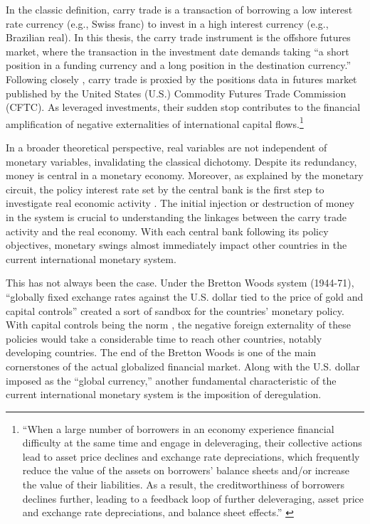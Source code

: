 \documentclass[a4paper, twoside]{templates/ociamthesis}
\begin{document}
In the classic definition, carry trade is a transaction of borrowing a low interest rate currency (e.g., Swiss franc) to invest in a high interest currency (e.g., Brazilian real). In this thesis, the carry trade instrument is the offshore futures market, where the transaction in the investment date demands taking ``a short position in a funding currency and a long position in the destination currency.'' \autocite[ 9]{bankforinternationalsettlements2015} Following closely \textcite{brunnermeier2008}, carry trade is proxied by the positions data in futures market published by the United States (U.S.) Commodity Futures Trade Commission (CFTC). As leveraged investments, their sudden stop contributes to the financial amplification of negative externalities of international capital flows.\footnote{``When a large number of borrowers in an economy experience financial difficulty at the same time and engage in deleveraging, their collective actions lead to asset price declines and exchange rate depreciations, which frequently reduce the value of the assets on borrowers' balance sheets and/or increase the value of their liabilities. As a result, the creditworthiness of borrowers declines further, leading to a feedback loop of further deleveraging, asset price and exchange rate depreciations, and balance sheet effects.'' \autocite[ 10]{erten2019}}

In a broader theoretical perspective, real variables are not independent of monetary variables, invalidating the classical dichotomy. Despite its redundancy, money is central in a monetary economy. Moreover, as explained by the monetary circuit, the policy interest rate set by the central bank is the first step to investigate real economic activity \autocite[  332]{rochon2015}. The initial injection or destruction of money in the system is crucial to understanding the linkages between the carry trade activity and the real economy. With each central bank following its policy objectives, monetary swings almost immediately impact other countries in the current international monetary system.

This has not always been the case. Under the Bretton Woods system (1944-71), ``globally fixed exchange rates against the U.S. dollar tied to the price of gold and capital controls'' \autocite[  146]{fields2015} created a sort of sandbox for the countries' monetary policy. With capital controls being the norm \autocite{grabel2016}, the negative foreign externality of these policies would take a considerable time to reach other countries, notably developing countries. The end of the Bretton Woods is one of the main cornerstones of the actual globalized financial market. Along with the U.S. dollar imposed as the ``global currency,'' another fundamental characteristic of the current international monetary system is the imposition of deregulation.
\end{document}
